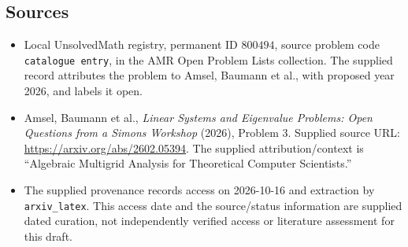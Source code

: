 \documentclass[11pt]{article}
\begin{document}
\subsection{Sources}
\begin{itemize}
\item Local UnsolvedMath registry, permanent ID \(800494\), source problem code \texttt{catalogue entry}, in the AMR Open Problem Lists collection. The supplied record attributes the problem to Amsel, Baumann et al., with proposed year 2026, and labels it open.
\item Amsel, Baumann et al., \emph{Linear Systems and Eigenvalue Problems: Open Questions from a Simons Workshop} (2026), Problem 3. Supplied source URL: \url{https://arxiv.org/abs/2602.05394}. The supplied attribution/context is ``Algebraic Multigrid Analysis for Theoretical Computer Scientists.''
\item The supplied provenance records access on 2026-10-16 and extraction by \texttt{arxiv\_latex}. This access date and the source/status information are supplied dated curation, not independently verified access or literature assessment for this draft.
\end{itemize}
\end{document}
